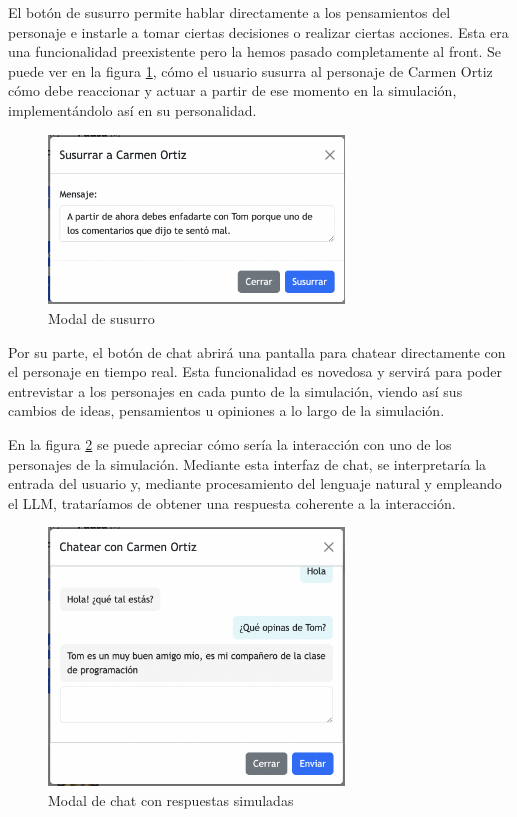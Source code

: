El botón de susurro permite hablar directamente a los pensamientos del personaje e instarle a tomar ciertas decisiones o realizar ciertas acciones. Esta era una funcionalidad preexistente pero la hemos pasado completamente al front. Se puede ver en la figura \ref{fig:cuadroSusurro}, cómo el usuario susurra al personaje de Carmen Ortiz cómo debe reaccionar y actuar a partir de ese momento en la simulación, implementándolo así en su personalidad.

\begin{figure}[H]
	\centering
	\includegraphics[width = 0.7\textwidth]{Imagenes/Vectorial/cuadroSusurro.png}
	\caption{Modal de susurro}
	\label{fig:cuadroSusurro}
\end{figure}

Por su parte, el botón de chat abrirá una pantalla para chatear directamente con el personaje en tiempo real. Esta funcionalidad es novedosa y servirá para poder entrevistar a los personajes en cada punto de la simulación, viendo así sus cambios de ideas, pensamientos u opiniones a lo largo de la simulación.

En la figura \ref{fig:cuadroChat} se puede apreciar cómo sería la interacción con uno de los personajes de la simulación. Mediante esta interfaz de chat, se interpretaría la entrada del usuario y, mediante procesamiento del lenguaje natural y empleando el LLM, trataríamos de obtener una respuesta coherente a la interacción.

\begin{figure}[H]
	\centering
	\includegraphics[width = 0.7\textwidth]{Imagenes/Vectorial/cuadroChat.png}
	\caption{Modal de chat con respuestas simuladas}
	\label{fig:cuadroChat}
\end{figure}



